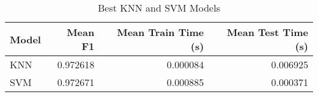 \begin{table}
\centering
\caption{Best KNN and SVM Models}
\label{tab:best_knn_and_svm_summary_hepatitis}
\begin{tabular}{lrrr}
\toprule
Model & Mean F1 & Mean Train Time (s) & Mean Test Time (s) \\
\midrule
KNN & 0.972618 & 0.000084 & 0.006925 \\
SVM & 0.972671 & 0.000885 & 0.000371 \\
\bottomrule
\end{tabular}
\end{table}
